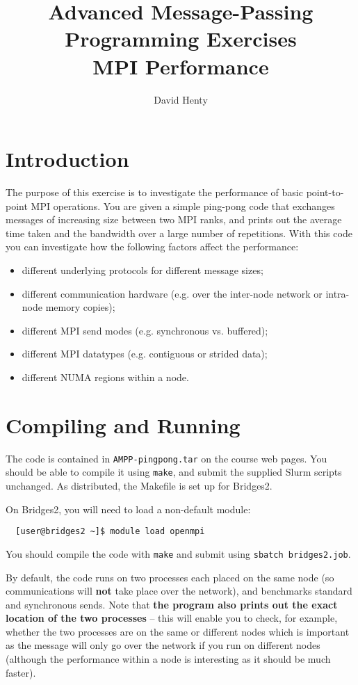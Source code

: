 \documentclass{article}
\begin{document}
\title{Advanced Message-Passing Programming Exercises \\
	MPI Performance}

\author{David Henty}
\date{}
\makeEPCCtitle

\section{Introduction}

The purpose of this exercise is to investigate the performance of
basic point-to-point MPI operations. You are given a simple ping-pong
code that exchanges messages of increasing size between two MPI ranks,
and prints out the average time taken and the bandwidth over a large
number of repetitions. With this code you can investigate how the
following factors affect the performance:

\begin{itemize}

\item different underlying protocols for different message sizes;
\item different communication hardware (e.g. over the inter-node network or
  intra-node memory copies);
\item different MPI send modes (e.g. synchronous vs. buffered);
\item different MPI datatypes (e.g. contiguous or strided data);
\item different NUMA regions within a node.

\end{itemize}

\section{Compiling and Running}

The code is contained in \verb+AMPP-pingpong.tar+ on the course web
pages. You should be able to compile it using \verb+make+, and submit
the supplied Slurm scripts unchanged. As distributed, the Makefile is
set up for Bridges2.

On Bridges2, you will need to load a non-default module:
\begin{verbatim}
  [user@bridges2 ~]$ module load openmpi
\end{verbatim}

You should compile the code with \texttt{make} and submit using \texttt{sbatch bridges2.job}.

By default, the code runs on two processes each placed on the same
node (so communications will {\bf not} take place over the
network), and benchmarks standard and synchronous sends. Note that
{\bf the program also prints out the exact location of the two
  processes} -- this will enable you to check, for example, whether the two processes
are on the same or different nodes which is important as the message will only
go over the network if you run on different nodes (although the performance
within a node is interesting as it should be much faster).
\end{document}
